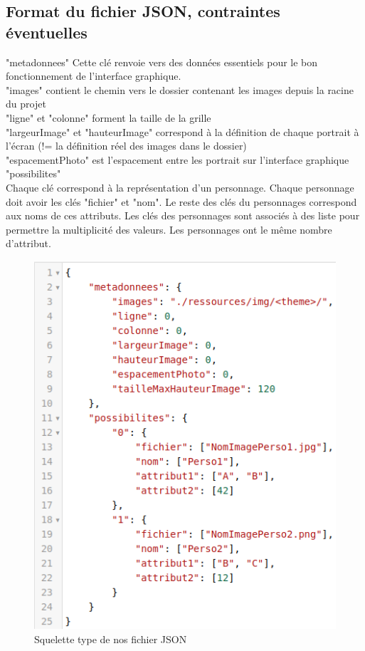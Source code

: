 \documentclass[a4paper]{article}
\begin{document}
 \subsection*{Format du fichier JSON, contraintes éventuelles}
 "metadonnees" Cette clé renvoie vers des données essentiels pour le bon fonctionnement de l'interface graphique.\\
 "images" contient le chemin vers le dossier contenant les images depuis la racine du projet \\
 "ligne" et "colonne" forment la taille de la grille\\
 "largeurImage" et "hauteurImage" correspond à la définition de chaque portrait à l'écran (!= la définition réel des images dans le dossier)\\
 "espacementPhoto" est l'espacement entre les portrait sur l'interface graphique\\
 "possibilites"\\
 Chaque clé correspond à la représentation d'un personnage.
 Chaque personnage doit avoir les clés "fichier" et "nom".
 Le reste des clés du personnages correspond aux noms de ces attributs.
 Les clés des personnages sont associés à des liste pour permettre la multiplicité des valeurs.
 Les personnages ont le même nombre d'attribut.
 
 \begin{figure}
   \caption{Squelette type de nos fichier JSON}
   \centering
   \includegraphics[scale=0.15]{./squeletteJSON.png}
 \end{figure}
 
\end{document}
